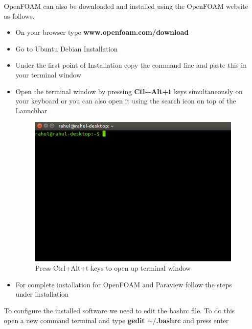 \documentclass[a4paper,12pt]{report}
\begin{document}
\flushleft OpenFOAM can also be downloaded and installed using the OpenFOAM website as follows. 
\begin{itemize}
\item On your browser type \textbf{www.openfoam.com/download} 
\item Go to Ubuntu Debian Installation
\item Under the first point of Installation copy the command line and paste this in your terminal window
\item Open the terminal window by pressing \textbf{Ctl+Alt+t} keys simultaneously on your keyboard or you can also open it using the search icon on top of the Launchbar

\begin{figure}[ht]  
\begin{center}  
\includegraphics[scale=0.28]{terminal.png}
\caption{Press Ctrl+Alt+t keys to open up terminal window}
\label{terminal}
\end{center}  
\end{figure}

\item For complete installation for OpenFOAM and Paraview follow the steps under installation

\end{itemize}

\flushleft To configure the installed software we need to edit the bashrc file. To do this open a new command terminal and type \textbf{gedit $\sim$$\slash$.bashrc} and press enter
\end{document}
